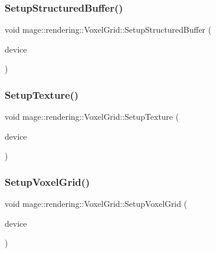 \hypertarget{classmage_1_1rendering_1_1_voxel_grid_a8f24eca860d059316a1aa40f2e878ecc}{}\label{classmage_1_1rendering_1_1_voxel_grid_a8f24eca860d059316a1aa40f2e878ecc} 
\subsubsection{\texorpdfstring{Setup\+Structured\+Buffer()}{SetupStructuredBuffer()}}
{\footnotesize\ttfamily void mage\+::rendering\+::\+Voxel\+Grid\+::\+Setup\+Structured\+Buffer (\begin{DoxyParamCaption}\item[{I\+D3\+D11\+Device \&}]{device }\end{DoxyParamCaption})\hspace{0.3cm}{\ttfamily [private]}}

\hypertarget{classmage_1_1rendering_1_1_voxel_grid_aa9b3ab18a4741ab9aa007965a43224eb}{}\label{classmage_1_1rendering_1_1_voxel_grid_aa9b3ab18a4741ab9aa007965a43224eb} 
\subsubsection{\texorpdfstring{Setup\+Texture()}{SetupTexture()}}
{\footnotesize\ttfamily void mage\+::rendering\+::\+Voxel\+Grid\+::\+Setup\+Texture (\begin{DoxyParamCaption}\item[{I\+D3\+D11\+Device \&}]{device }\end{DoxyParamCaption})\hspace{0.3cm}{\ttfamily [private]}}

\hypertarget{classmage_1_1rendering_1_1_voxel_grid_af7796e22a1a02c50c77b2c8d40d800c0}{}\label{classmage_1_1rendering_1_1_voxel_grid_af7796e22a1a02c50c77b2c8d40d800c0} 
\subsubsection{\texorpdfstring{Setup\+Voxel\+Grid()}{SetupVoxelGrid()}}
{\footnotesize\ttfamily void mage\+::rendering\+::\+Voxel\+Grid\+::\+Setup\+Voxel\+Grid (\begin{DoxyParamCaption}\item[{I\+D3\+D11\+Device \&}]{device }\end{DoxyParamCaption})\hspace{0.3cm}{\ttfamily [private]}}



